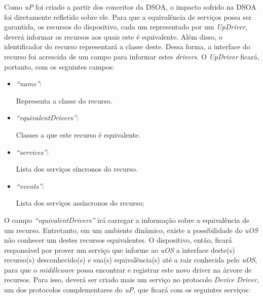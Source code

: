 Como \emph{uP} foi criado a partir dos conceitos da DSOA, o impacto sofrido na DSOA foi diretamente refletido sobre ele. Para que a equivalência de serviços possa ser garantida, os recursos do dispositivo, cada um representado por um \emph{UpDriver}, deverá informar os recursos aos quais este é equivalente. Além disso, o identificador do recurso representará a classe deste. Dessa forma, a interface do recurso foi acrescida de um campo para informar estes \emph{drivers}. O \emph{UpDriver} ficará, portanto, com os seguintes campos:

\begin{itemize}
	\item \emph{``name''}:
		
		Representa a classe do recurso.

	\item \emph{``equivalentDrivers''}:
	
		Classes a que este recurso é equivalente.
	\item \emph{``services''}:

		Lista dos serviços síncronos do recurso.

	\item \emph{``events''}:

		Lista dos serviços assíncronos do recurso;
\end{itemize}

O campo \emph{``equivalentDrivers''} irá carregar a informação sobre a equivalência de um recurso. Entretanto, em um ambiente dinâmico, existe a possibilidade do \emph{uOS} não conhecer um destes recursos equivalentes. O dispositivo, então, ficará responsável por prover um serviço que informe ao \emph{uOS} a interface deste(s) recurso(s) desconhecido(s) e sua(s) equivalência(s) até a raiz conhecida pelo \emph{uOS}, para que o \emph{middleware} possa encontrar e registrar este novo driver na árvore de recursos. Para isso, deverá ser criado mais um serviço no protocolo \emph{Device Driver}, um dos protocolos complementares do \emph{uP}, que ficará com os seguintes serviços:

